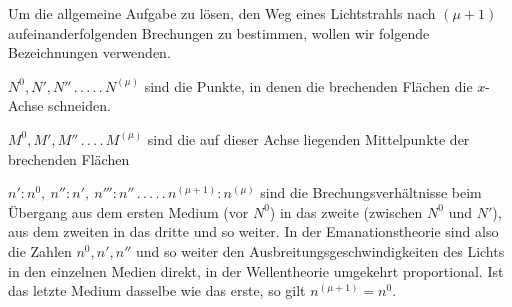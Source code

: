 Um die allgemeine Aufgabe zu lösen, den Weg eines Lichtstrahls nach $(\mu+1)$ aufeinanderfolgenden Brechungen zu bestimmen, wollen wir folgende Bezeichnungen verwenden.

$N^0,N',N''\, .\, .\, .\, .\, .\, N^{(\mu)}$ sind die Punkte, in denen die brechenden Flächen die $x$-Achse schneiden.

$M^0,M',M''\, .\, .\, .\, .\, M^{(\mu)}$ sind die auf dieser Achse liegenden Mittelpunkte der brechenden Flächen

$n':n^0,\ n'':n',\ n''':n''\, .\, .\, .\, .\, .\, n^{(\mu+1)}:n^{(\mu)}$ sind die Brechungsverhältnisse beim Übergang aus dem ersten Medium (vor $N^0$) in das zweite (zwischen $N^0$ und $N'$), aus dem zweiten in das dritte und so weiter. In der Emanationstheorie sind also die Zahlen $n^0,n',n''$ und so weiter den Ausbreitungsgeschwindigkeiten des Lichts in den einzelnen Medien direkt, in der Wellentheorie umgekehrt proportional. Ist das letzte Medium dasselbe wie das erste, so gilt $n^{(\mu+1)}=n^0$.

